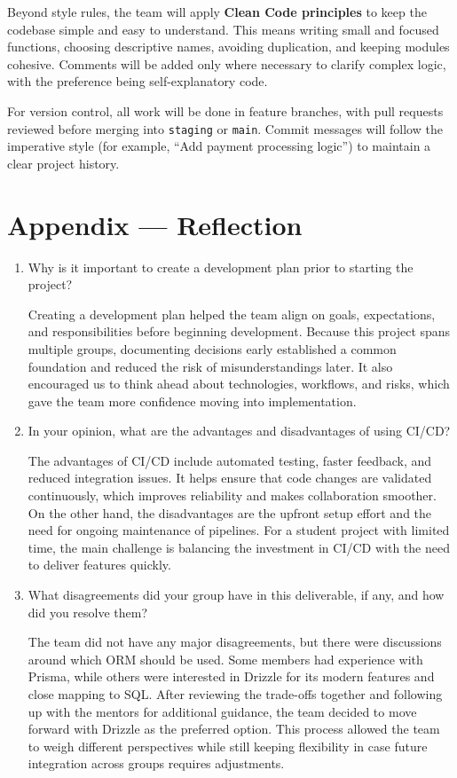\documentclass{article}
\begin{document}
Beyond style rules, the team will apply \textbf{Clean Code principles} to keep the codebase simple and easy to understand. This means writing small and focused functions, choosing descriptive names, avoiding duplication, and keeping modules cohesive. Comments will be added only where necessary to clarify complex logic, with the preference being self-explanatory code.

For version control, all work will be done in feature branches, with pull requests reviewed before merging into \texttt{staging} or \texttt{main}. Commit messages will follow the imperative style (for example, “Add payment processing logic”) to maintain a clear project history.

\newpage{}

\section*{Appendix --- Reflection}

\begin{enumerate}
    \item Why is it important to create a development plan prior to starting the
    project?

    Creating a development plan helped the team align on goals, expectations, and responsibilities before beginning development. Because this project spans multiple groups, documenting decisions early established a common foundation and reduced the risk of misunderstandings later. It also encouraged us to think ahead about technologies, workflows, and risks, which gave the team more confidence moving into implementation.
    
    \item In your opinion, what are the advantages and disadvantages of using
    CI/CD?

    The advantages of CI/CD include automated testing, faster feedback, and reduced integration issues. It helps ensure that code changes are validated continuously, which improves reliability and makes collaboration smoother. On the other hand, the disadvantages are the upfront setup effort and the need for ongoing maintenance of pipelines. For a student project with limited time, the main challenge is balancing the investment in CI/CD with the need to deliver features quickly.
    
    \item What disagreements did your group have in this deliverable, if any,
    and how did you resolve them?
   
    The team did not have any major disagreements, but there were discussions around which ORM should be used. Some members had experience with Prisma, while others were interested in Drizzle for its modern features and close mapping to SQL. After reviewing the trade-offs together and following up with the mentors for additional guidance, the team decided to move forward with Drizzle as the preferred option. This process allowed the team to weigh different perspectives while still keeping flexibility in case future integration across groups requires adjustments.
\end{enumerate}
\end{document}
